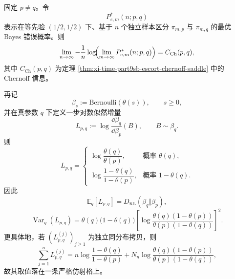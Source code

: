 \begin{corollary}[等先验温度判别的最优误差指数与顺序对数似然步长都具有闭式]\label{cor:xi-time-part9sb-escort-error-exponent-lattice-walk}
固定 \(p\neq q\)。令
\[
P_{e,m}^{\ast}(n;p,q)
\]
表示在等先验 \((1/2,1/2)\) 下、基于 \(n\) 个独立样本区分 \(\pi_{m,p}\) 与 \(\pi_{m,q}\) 的最优 Bayes 错误概率。则
\[
\lim_{n\to\infty}
-\frac1n
\log\!\Bigl(
\lim_{m\to\infty}P_{e,m}^{\ast}(n;p,q)
\Bigr)
=
C_{\mathrm{Ch}}(p,q),
\]
其中 \(C_{\mathrm{Ch}}(p,q)\) 为定理 \ref{thm:xi-time-part9sb-escort-chernoff-saddle} 中的 Chernoff 信息。

再记
\[
\beta_s:=\mathrm{Bernoulli}(\theta(s)),
\qquad s\ge 0,
\]
并在真参数 \(q\) 下定义一步对数似然增量
\[
L_{p,q}:=\log\frac{\dd\beta_q}{\dd\beta_p}(B),
\qquad
B\sim\beta_q.
\]
则
\[
L_{p,q}
=
\begin{cases}
\log\dfrac{\theta(q)}{\theta(p)}, & \text{概率 }\theta(q),\\[1.2ex]
\log\dfrac{1-\theta(q)}{1-\theta(p)}, & \text{概率 }1-\theta(q).
\end{cases}
\]
因此
\[
\mathbb E_q[L_{p,q}]
=
D_{\mathrm{KL}}(\beta_q\Vert \beta_p),
\]
\[
\operatorname{Var}_q(L_{p,q})
=
\theta(q)\bigl(1-\theta(q)\bigr)
\left[
\log\frac{\theta(q)(1-\theta(p))}{\theta(p)(1-\theta(q))}
\right]^2.
\]
更具体地，若 \((L_{p,q}^{(j)})_{j\ge 1}\) 为独立同分布拷贝，则
\[
\sum_{j=1}^n L_{p,q}^{(j)}
=
n\log\frac{1-\theta(q)}{1-\theta(p)}
+
N_n\log\frac{\theta(q)(1-\theta(p))}{\theta(p)(1-\theta(q))},
\]
故其取值落在一条严格仿射格上。
\end{corollary}

